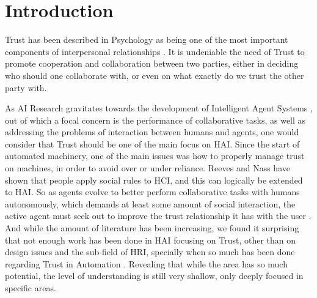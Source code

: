 \section{Introduction}
\label{sec:Introduction}

Trust has been described in Psychology as being one of the most important components of interpersonal relationships \cite{Simpson2007}. It is undeniable the need of Trust to promote cooperation and collaboration between two parties, either in deciding who should one collaborate with, or even on what exactly do we trust the other party with. 


As \ac{AI} Research gravitates towards the development of Intelligent Agent Systems \cite{Russell2009a}, out of which a focal concern is the performance of collaborative tasks\cite{Grosz1996, Allen2002, Allen2007}, as well as addressing the problems of interaction between humans and agents\cite{Bradshaw2011}, one would consider that Trust should be one of the main focus on \ac{HAI}. Since the start of automated machinery, one of the main issues was how to properly manage trust on machines, in order to avoid over or under reliance\cite{Lee2004}. Reeves and Nass have shown that people apply social rules to \ac{HCI}, and this can logically be extended to \ac{HAI}\cite{Reeves1998a}. So as agents evolve to better perform collaborative tasks with humans autonomously, which demands at least some amount of social interaction, the active agent must seek out to improve the trust relationship it has with the user \cite{Lashkari1994}. And while the amount of literature has been increasing, we found it surprising that not enough work has been done in \ac{HAI} focusing on Trust, other than on design issues\cite{Bickmore2005} and the sub-field of \ac{HRI}\cite{Goodrich2007, VandenBrule2014}, specially when so much has been done regarding Trust in Automation \cite{Lee1992, Jones1997, Lee2004}. Revealing that while the area has so much potential, the level of understanding is still very shallow, only deeply focused in specific areas.

